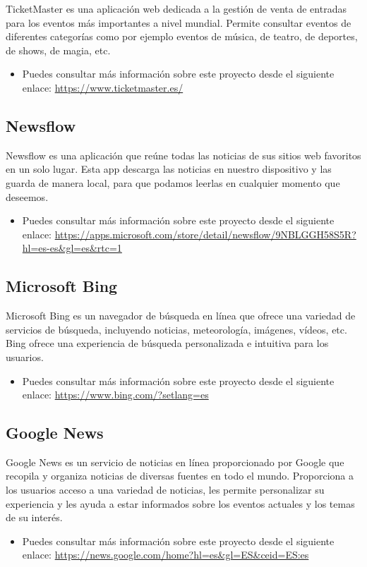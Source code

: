 TicketMaster es una aplicación web dedicada a la gestión de venta de entradas para los eventos más importantes a nivel mundial. Permite consultar eventos de diferentes categorías como por ejemplo eventos de música, de teatro, de deportes, de shows, de magia, etc.


\begin{itemize}
    \item Puedes consultar más información sobre este proyecto desde el siguiente enlace: \url{https://www.ticketmaster.es/}
\end{itemize}

\subsection{Newsflow}

Newsflow es una aplicación que reúne todas las noticias de sus sitios web favoritos en un solo lugar. Esta app descarga las noticias en nuestro dispositivo y las guarda de manera local, para que podamos leerlas en cualquier momento que deseemos.


\begin{itemize}
    \item Puedes consultar más información sobre este proyecto desde el siguiente enlace: \url{https://apps.microsoft.com/store/detail/newsflow/9NBLGGH58S5R?hl=es-es&gl=es&rtc=1}
\end{itemize}

\subsection{Microsoft Bing}

Microsoft Bing es un navegador de búsqueda en línea que ofrece una variedad de servicios de búsqueda, incluyendo noticias, meteorología, imágenes, vídeos, etc. Bing ofrece una experiencia de búsqueda personalizada e intuitiva para los usuarios.

\begin{itemize}
    \item Puedes consultar más información sobre este proyecto desde el siguiente enlace: \url{https://www.bing.com/?setlang=es}
\end{itemize}

\subsection{Google News}
Google News es un servicio de noticias en línea proporcionado por Google que recopila y organiza noticias de diversas fuentes en todo el mundo. Proporciona a los usuarios acceso a una variedad de noticias, les permite personalizar su experiencia y les ayuda a estar informados sobre los eventos actuales y los temas de su interés.

\begin{itemize}
    \item Puedes consultar más información sobre este proyecto desde el siguiente enlace: \url{https://news.google.com/home?hl=es&gl=ES&ceid=ES:es}
\end{itemize}
